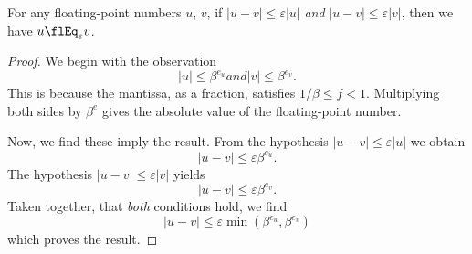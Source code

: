 \begin{thm}
  For any floating-point numbers $u$, $v$, if $|u-v|\leq\varepsilon|u|$
  \emph{and} $|u-v|\leq\varepsilon|v|$, then we have $u\flEq_{\varepsilon}v$.
\end{thm}
\begin{proof}
  We begin with the observation
  \begin{subequations}
    \begin{equation}
      |u|\leq \beta^{e_{u}}
    \end{equation}
    and
    \begin{equation}
      |v|\leq\beta^{e_{v}}.
    \end{equation}
  \end{subequations}
  This is because the mantissa, as a fraction, satisfies $1/\beta\leq f<1$.
  Multiplying both sides by $\beta^{e}$ gives the absolute value of the
  floating-point number.

  Now, we find these imply the result. From the hypothesis $|u-v|\leq\varepsilon|u|$
  we obtain
  \begin{equation}
    |u-v|\leq\varepsilon\beta^{e_{u}}.
  \end{equation}
  The hypothesis $|u-v|\leq\varepsilon|v|$ yields
  \begin{equation}
    |u-v|\leq\varepsilon\beta^{e_{v}}.
  \end{equation}
  Taken together, that \emph{both} conditions hold, we find
  \begin{equation}
    |u-v|\leq\varepsilon\min(\beta^{e_{u}},\beta^{e_{v}})
  \end{equation}
  which proves the result.
\end{proof}


